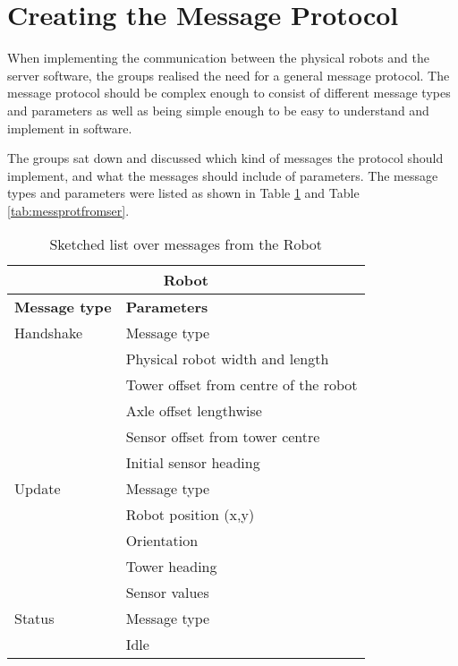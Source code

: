 \section{Creating the Message Protocol}
\label{sec:cremessprot}
When implementing the communication between the physical robots and the server software, the groups realised the need for a general message protocol. The message protocol should be complex enough to consist of different message types and parameters as well as being simple enough to be easy to understand and implement in software. 

The groups sat down and discussed which kind of messages the protocol should implement, and what the messages should include of parameters. The message types and parameters were listed as shown in Table \ref{tab:messprotfromrob} and Table \ref{tab:messprotfromser}.

\begin{table}[ht]
\begin{center}
 \begin{tabular}{|l | l|} 
 \hline
 \multicolumn{2}{|c|}{\textbf{Robot}}\\
 \hline
 \hline
 \textbf{Message type}       &    \textbf{Parameters} \\
 \hline

 Handshake          &   Message type \\
                     &    Physical robot width and length  \\
                    &   Tower offset from centre of the robot\\
                    &    Axle offset lengthwise \\
                    &    Sensor offset from tower centre \\
                    &    Initial sensor heading \\
 \hline
 Update              &   Message type \\
                    &   Robot position (x,y) \\
                    &   Orientation \\
                    &   Tower heading \\
                    &    Sensor values \\
 \hline
 Status                &   Message type \\
                     &    Idle\\
 \hline
 \end{tabular}
\end{center}
\caption{Sketched list over messages from the Robot}
\label{tab:messprotfromrob}
\end{table}

